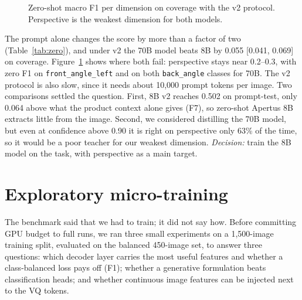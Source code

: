 \documentclass[11pt]{article}
\begin{document}
\begin{figure}[ht]
\centering
{}
\caption{Zero-shot macro F1 per dimension on coverage with the v2 protocol. Perspective is the weakest dimension for both models.}
\label{fig:zeroshot}
\end{figure}

The prompt alone changes the score by more than a factor of two (Table~\ref{tab:zero}), and under v2 the 70B model beats 8B by 0.055 [0.041, 0.069] on coverage. Figure~\ref{fig:zeroshot} shows where both fail: perspective stays near 0.2--0.3, with zero F1 on \texttt{front\_angle\_left} and on both \texttt{back\_angle} classes for 70B. The v2 protocol is also slow, since it needs about 10,000 prompt tokens per image. Two comparisons settled the question. First, 8B v2 reaches 0.502 on prompt-test, only 0.064 above what the product context alone gives (F7), so zero-shot Apertus 8B extracts little from the image. Second, we considered distilling the 70B model, but even at confidence above 0.90 it is right on perspective only 63\% of the time, so it would be a poor teacher for our weakest dimension. \emph{Decision:} train the 8B model on the task, with perspective as a main target.

\section{Exploratory micro-training}
\label{sec:micro}
The benchmark said that we had to train; it did not say how. Before committing GPU budget to full runs, we ran three small experiments on a 1,500-image training split, evaluated on the balanced 450-image set, to answer three questions: which decoder layer carries the most useful features and whether a class-balanced loss pays off (F1); whether a generative formulation beats classification heads; and whether continuous image features can be injected next to the VQ tokens.
\end{document}
